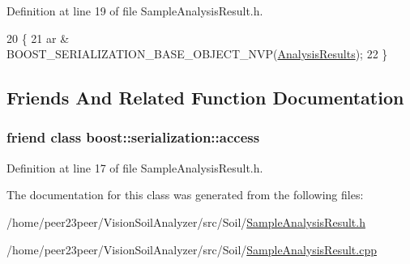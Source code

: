Definition at line 19 of file Sample\+Analysis\+Result.\+h.


\begin{DoxyCode}
20         \{
21             ar & BOOST\_SERIALIZATION\_BASE\_OBJECT\_NVP(\hyperlink{class_soil_analyzer_1_1_analysis_results_a893864c1e4bf50bf6979088a390da482}{AnalysisResults});
22         \}
\end{DoxyCode}


\subsection{Friends And Related Function Documentation}
\hypertarget{class_soil_analyzer_1_1_sample_analysis_result_ac98d07dd8f7b70e16ccb9a01abf56b9c}{}
\subsubsection[{boost\+::serialization\+::access}]{\setlength{\rightskip}{0pt plus 5cm}friend class boost\+::serialization\+::access\hspace{0.3cm}{\ttfamily [friend]}}\label{class_soil_analyzer_1_1_sample_analysis_result_ac98d07dd8f7b70e16ccb9a01abf56b9c}


Definition at line 17 of file Sample\+Analysis\+Result.\+h.



The documentation for this class was generated from the following files\+:\begin{DoxyCompactItemize}
\item 
/home/peer23peer/\+Vision\+Soil\+Analyzer/src/\+Soil/\hyperlink{_sample_analysis_result_8h}{Sample\+Analysis\+Result.\+h}\item 
/home/peer23peer/\+Vision\+Soil\+Analyzer/src/\+Soil/\hyperlink{_sample_analysis_result_8cpp}{Sample\+Analysis\+Result.\+cpp}\end{DoxyCompactItemize}
